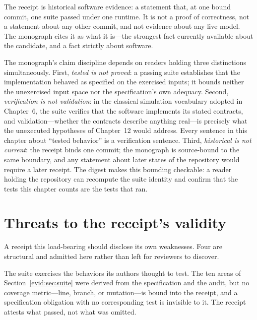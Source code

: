 \begin{remark}\label{evid:rem:receipt}
The receipt is historical software evidence: a statement that, at one bound commit, one suite passed under one runtime. It is not a proof of correctness, not a statement about any other commit, and not evidence about any live model. The monograph cites it as what it is---the strongest fact currently available about the candidate, and a fact strictly about software.
\end{remark}

The monograph's claim discipline depends on readers holding three distinctions simultaneously. First, \emph{tested is not proved}: a passing suite establishes that the implementation behaved as specified on the exercised inputs; it bounds neither the unexercised input space nor the specification's own adequacy. Second, \emph{verification is not validation}: in the classical simulation vocabulary adopted in Chapter~6, the suite verifies that the software implements its stated contracts, and validation---whether the contracts describe anything real---is precisely what the unexecuted hypotheses of Chapter~12 would address. Every sentence in this chapter about ``tested behavior'' is a verification sentence. Third, \emph{historical is not current}: the receipt binds one commit; the monograph is source-bound to the same boundary, and any statement about later states of the repository would require a later receipt. The digest makes this bounding checkable: a reader holding the repository can recompute the suite identity and confirm that the tests this chapter counts are the tests that ran.

\section{Threats to the receipt's validity}\label{evid:sec:threats}

A receipt this load-bearing should disclose its own weaknesses. Four are structural and admitted here rather than left for reviewers to discover.

\begin{threat}\label{evid:threat:coverage}
The suite exercises the behaviors its authors thought to test. The ten areas of Section~\ref{evid:sec:suite} were derived from the specification and the audit, but no coverage metric---line, branch, or mutation---is bound into the receipt, and a specification obligation with no corresponding test is invisible to it. The receipt attests what passed, not what was omitted.
\end{threat}

